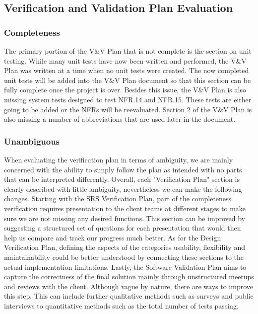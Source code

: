 \documentclass[12pt, titlepage]{article}
\begin{document}
\subsection{Verification and Validation Plan Evaluation}

\subsubsection{Completeness}

The primary portion of the V\&V Plan that is not complete is the section on unit testing. While many unit tests have now been written and performed, the V\&V Plan was written at a time when no unit tests were created. The now completed unit tests will be added into the V\&V Plan document so that this section can be fully complete once the project is over. Besides this issue, the V\&V Plan is also missing system tests designed to test NFR.14 and NFR.15. These tests are either going to be added or the NFRs will be reevaluated. Section 2 of the V\&V Plan is also missing a number of abbreviations that are used later in the document.

\subsubsection{Unambiguous}

When evaluating the verification plan in terms of ambiguity, we are mainly concerned with the ability to simply follow the plan as intended with no parts that can be interpreted differently. Overall, each "Verification Plan" section is clearly described with little ambiguity, nevertheless we can make the following changes. Starting with the SRS Verification Plan, part of the completeness verification requires presentation to the client teams at different stages to make sure we are not missing any desired functions. This section can be improved by suggesting a structured set of questions for each presentation that would then help us compare and track our progress much better. As for the Design Verification Plan, defining the aspects of the categories usability, flexibility and maintainability could be better understood by connecting these sections to the actual implementation limitations. Lastly, the Software Validation Plan aims to capture the correctness of the final solution mainly through unstructured meetups and reviews with the client. Although vague by nature, there are ways to improve this step. This can include further qualitative methods such as surveys and public interviews to quantitative methods such as the total number of tests passing. 
\end{document}
